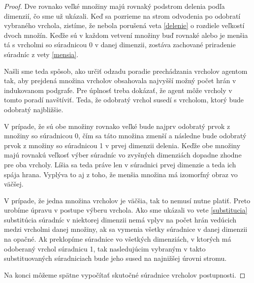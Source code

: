 \begin{proof}
Dve rovnako veľké množiny majú rovnaký podstrom
delenia podľa dimenzií, čo sme už ukázali. Keď sa pozrieme na strom
odvodenia po odobratí vybraného vrchola, zistíme, že nebola porušená veta
\ref{delenie} o rozdiele veľkostí dvoch množín. Keďže sú v každom vetvení
množiny buď rovnaké alebo je menšia tá s vrcholmi so súradnicou 0 v danej
dimenzii, zostáva zachované priradenie súradníc z vety \ref{mensia}.

Našli sme teda spôsob, ako určiť odzadu poradie prechádzania vrcholov
agentom tak, aby prejdená množina vrcholov obsahovala najvyšší možný počet
hrán v indukovanom podgrafe. Pre úplnosť treba dokázať, že agent môže
vrcholy v tomto poradí navštíviť. Teda, že odobratý vrchol susedí s
vrcholom, ktorý bude odobratý najbližšie.

V prípade, že sú obe množiny rovnako veľké bude najprv odobratý prvok z
množiny so súradnicou 0, čím sa táto množina zmenší a následne bude odobratý
prvok z množiny so súradnicou 1 v prvej dimenzii delenia. Keďže obe množiny
majú rovnakú veľkosť výber súradníc vo zvyšných dimenziách dopadne zhodne
pre oba vrcholy. Líšia sa teda práve len v súradnici prvej dimenzie a teda ich
spája hrana. Vyplýva to aj z toho, že menšia množina má izomorfný obraz vo
väčšej.

V prípade, že jedna množina vrcholov je väčšia, tak to nemusí nutne platiť.
Preto urobíme úpravu v postupe výberu vrchola. Ako sme ukázali vo vete
\ref{substitucia} substitúcia súradníc v niektorej dimenzii nemá vplyv 
na počet hrán vedúcich
medzi vrcholmi danej množiny, ak sa vymenia všetky súradnice v danej
dimenzii na opačné. Ak preklopíme súradnice vo všetkých dimenziách, v
ktorých má odoberaný vrchol súradnicu 1, tak nasledujúcim vybraným v takto
substituovaných súradniciach bude jeho sused na najnižšej úrovni stromu.

Na konci môžeme spätne vypočítať skutočné súradnice vrcholov postupnosti.
\end{proof}

\iffalse
Tak toto je blbosť
\begin{pozn}
Keď sa pozrieme na dôkaz predošlej vety a ľubovoľný súvislý úsek postupnosti
optimálnej konštrukcie, vidíme, že veta preň platí. Teda jediná podmienka,
aby bola podpostupnosť optimálna je, aby to bol súvislý úsek.

Vrcholy sú totiž do každej množiny v strome delenia pridávané na striedačku
po jednom do ľavého aj pravého podstraomu v každom uzle. Neporuší sa teda
nikdy rovnováha, keď rozdiel mohutnosti množín v podstromoch ostáva najviac
1.
\end{pozn}
\fi

